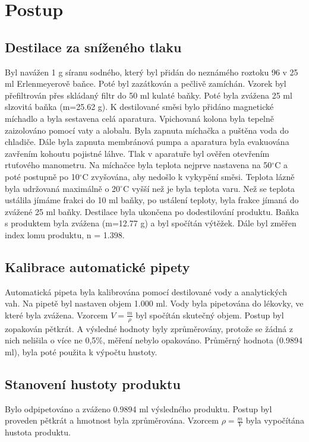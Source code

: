 \documentclass[13pt, a4paper, twoside]{article}
\begin{document}
\section*{Postup}

\subsection*{Destilace za sníženého tlaku}
Byl navážen 1 g síranu sodného, který byl přidán do neznámého roztoku
96 v 25 ml Erlenmeyerově baňce. Poté byl zazátkován a pečlivě zamíchán.
Vzorek byl přefiltrován přes skládaný filtr do 50 ml kulaté baňky.
Poté byla zvážena 25 ml slzovitá baňka (m=25.62 g).
K destilované směsi bylo přidáno magnetické míchadlo a byla sestavena celá aparatura.
Vpichovaná kolona byla tepelně zaizolováno pomocí vaty a alobalu. Byla zapnuta míchačka a puštěna voda do chladiče.
Dále byla zapnuta membránová pumpa a aparatura byla evakuována zavřením kohoutu pojistné láhve.
Tlak v aparatuře byl ověřen otevřením rtuťového manometru.
Na míchačce byla teplota nejprve nastavena na 50$^\circ$C a poté postupně po 10$^\circ$C zvyšována, aby nedošlo k vykypění směsi.
Teplota lázně byla udržovaná maximálně o 20$^\circ$C vyšší než je byla teplota varu.
Než se teplota ustálila jímáme frakci do 10 ml baňky, po ustálení teploty, byla frakce jímaná do zvážené 25 ml baňky.
Destilace byla ukončena po dodestilování produktu. Baňka s produktem byla zvážena (m=12.77 g) a byl spočítán výtěžek.
Dále byl změřen index lomu produktu, n = 1.398.

\subsection*{Kalibrace automatické pipety}
Automatická pipeta byla kalibrována pomocí destilované vody a analytických vah. Na pipetě byl nastaven objem 1.000 ml. Vody byla pipetována do lékovky, ve které byla zvážena.
Vzorcem $V=\frac{m}{\rho}$ byl spočítán skutečný objem.
Postup byl zopakován pětkrát. A výsledné hodnoty byly zprůměrovány, protože se žádná z nich nelišila o více ne 0,5\%, měření nebylo opakováno. Průměrný hodnota (0.9894 ml), byla poté použita k výpočtu hustoty.

\subsection*{Stanovení hustoty produktu}
Bylo odpipetováno a zváženo 0.9894 ml výsledného produktu. Postup byl proveden pětkrát a hmotnost byla zprůměrována. Vzorcem $\rho= \frac{m}{V}$ byla vypočítána hustota produktu.
\end{document}
